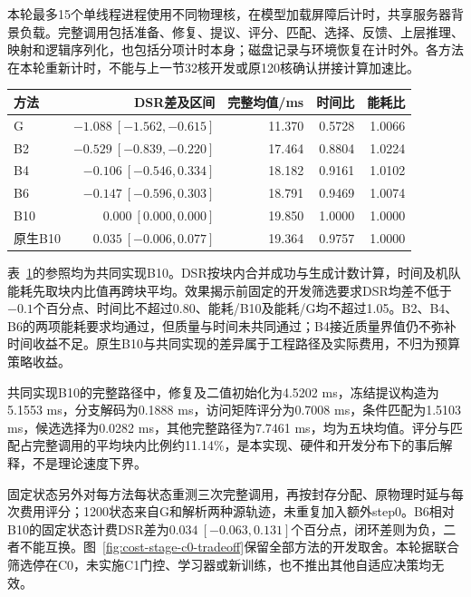 本轮最多15个单线程进程使用不同物理核，在模型加载屏障后计时，共享服务器背景负载。完整调用包括准备、修复、提议、评分、匹配、选择、反馈、上层推理、映射和逻辑序列化，也包括分项计时本身；磁盘记录与环境恢复在计时外。各方法在本轮重新计时，不能与上一节32核开发或原120核确认拼接计算加速比。

\begin{table}[!htbp]
\centering
{}
\label{tab:cost-stage-c0-prefix}
\small
\setlength{\tabcolsep}{4pt}
\begin{tabular}{lrrrr}
\toprule
方法 & DSR差及区间 & 完整均值/ms & 时间比 & 能耗比\\
\midrule
G & $-1.088\ [-1.562,-0.615]$ & 11.370 & 0.5728 & 1.0066\\
B2 & $-0.529\ [-0.839,-0.220]$ & 17.464 & 0.8804 & 1.0224\\
B4 & $-0.106\ [-0.546,0.334]$ & 18.182 & 0.9161 & 1.0102\\
B6 & $-0.147\ [-0.596,0.303]$ & 18.791 & 0.9469 & 1.0074\\
B10 & $0.000\ [0.000,0.000]$ & 19.850 & 1.0000 & 1.0000\\
原生B10 & $0.035\ [-0.006,0.077]$ & 19.364 & 0.9757 & 1.0000\\
\bottomrule
\end{tabular}
\end{table}

表~\ref{tab:cost-stage-c0-prefix}的参照均为共同实现B10。DSR按块内合并成功与生成计数计算，时间及机队能耗先取块内比值再跨块平均。效果揭示前固定的开发筛选要求DSR均差不低于$-0.1$个百分点、时间比不超过0.80、能耗/B10及能耗/G均不超过1.05。B2、B4、B6的两项能耗要求均通过，但质量与时间未共同通过；B4接近质量界值仍不弥补时间收益不足。原生B10与共同实现的差异属于工程路径及实际费用，不归为预算策略收益。

共同实现B10的完整路径中，修复及二值初始化为4.5202 ms，冻结提议构造为5.1553 ms，分支解码为0.1888 ms，访问矩阵评分为0.7008 ms，条件匹配为1.5103 ms，候选选择为0.0282 ms，其他完整路径为7.7461 ms，均为五块均值。评分与匹配占完整调用的平均块内比例约11.14\%，是本实现、硬件和开发分布下的事后解释，不是理论速度下界。

固定状态另外对每方法每状态重测三次完整调用，再按封存分配、原物理时延与每次费用评分；1200状态来自G和解析两种源轨迹，未重复加入额外step0。B6相对B10的固定状态计费DSR差为$0.034\ [-0.063,0.131]$个百分点，闭环差则为负，二者不能互换。图~\ref{fig:cost-stage-c0-tradeoff}保留全部方法的开发取舍。本轮据联合筛选停在C0，未实施C1门控、学习器或新训练，也不推出其他自适应决策均无效。

